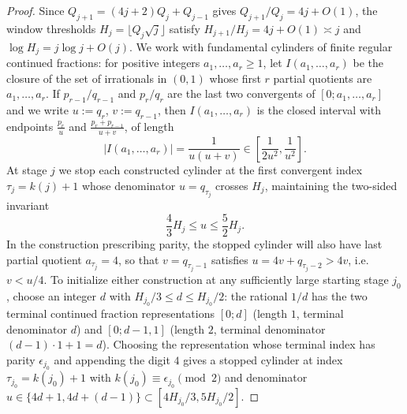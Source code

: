 \documentclass[11pt]{article}
\theoremstyle{definition}
\theoremstyle{remark}
\begin{document}
\begin{proof}
Since $Q_{j+1}=(4j+2)Q_j+Q_{j-1}$ gives $Q_{j+1}/Q_j=4j+O(1)$, the window
thresholds $H_j=\lfloor Q_j\sqrt j\rfloor$ satisfy $H_{j+1}/H_j=4j+O(1)\asymp j$
and $\log H_j=j\log j+O(j)$. We work with fundamental cylinders of finite
regular continued fractions: for positive integers $a_1,\dots,a_r\ge1$, let
$I(a_1,\dots,a_r)$ be the closure of the set of irrationals in $(0,1)$ whose
first $r$ partial quotients are $a_1,\dots,a_r$. If $p_{r-1}/q_{r-1}$ and
$p_r/q_r$ are the last two convergents of $[0;a_1,\dots,a_r]$ and we write
$u:=q_r$, $v:=q_{r-1}$, then $I(a_1,\dots,a_r)$ is the closed interval with
endpoints $\frac{p_r}{u}$ and $\frac{p_r+p_{r-1}}{u+v}$, of length
\[
\bigl|I(a_1,\dots,a_r)\bigr|=\frac{1}{u(u+v)}\in\left[\frac{1}{2u^2},\frac{1}{u^2}\right].
\]
At stage $j$ we stop each constructed cylinder at the first convergent index
$\tau_j=k(j)+1$ whose denominator $u=q_{\tau_j}$ crosses $H_j$, maintaining the
two-sided invariant
\[
\frac43 H_j\le u\le \frac52 H_j.
\]
In the construction prescribing parity, the stopped cylinder will also have
last partial quotient $a_{\tau_j}=4$, so that $v=q_{\tau_j-1}$ satisfies
$u=4v+q_{\tau_j-2}>4v$, i.e.\ $v<u/4$. To initialize either construction at any
sufficiently large starting stage $j_0$, choose an integer $d$ with
$H_{j_0}/3\le d\le H_{j_0}/2$: the rational $1/d$ has the two terminal continued
fraction representations $[0;d]$ (length $1$, terminal denominator $d$) and
$[0;d-1,1]$ (length $2$, terminal denominator $(d-1)\cdot1+1=d$). Choosing the
representation whose terminal index has parity $\epsilon_{j_0}$ and appending
the digit $4$ gives a stopped cylinder at index $\tau_{j_0}=k(j_0)+1$ with
$k(j_0)\equiv\epsilon_{j_0}\pmod2$ and denominator
$u\in\{4d+1,4d+(d-1)\}\subset[4H_{j_0}/3,5H_{j_0}/2]$.


\end{proof}
\end{document}

